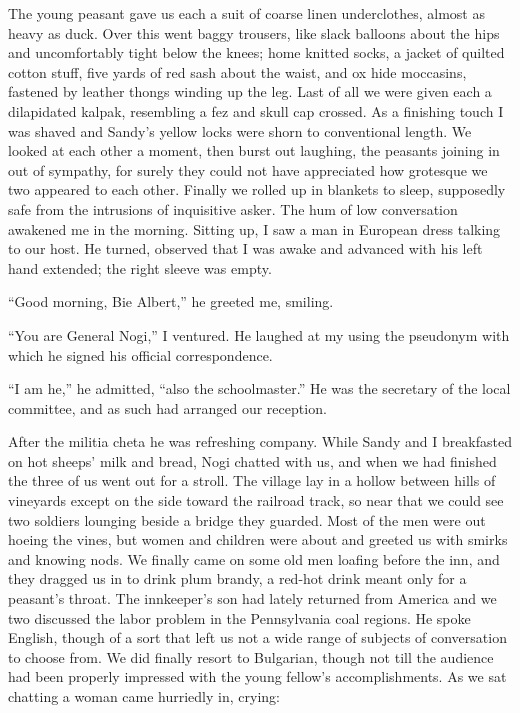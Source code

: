 \documentclass[a5paper,12pt]{book}
\begin{document}
The young peasant gave us each a suit of coarse linen underclothes, almost as heavy as duck. Over this went baggy trousers, like slack balloons about the hips and uncomfortably tight below the knees; home knitted socks, a jacket of quilted cotton stuff, five yards of red sash about the waist, and ox hide moccasins, fastened by leather thongs winding up the leg. Last of all we were given each a dilapidated kalpak, resembling a fez and skull cap crossed. As a finishing touch I was shaved and Sandy’s yellow locks were shorn to conventional length. We looked at each other a moment, then burst out laughing, the peasants joining in out of sympathy, for surely they could not have appreciated how grotesque we two appeared to each other. Finally we rolled up in blankets to sleep, supposedly safe from the intrusions of inquisitive asker.
The hum of low conversation awakened me in the morning. Sitting up, I saw a man in European dress talking to our host. He turned, observed that I was awake and advanced with his left hand extended; the right sleeve was empty.

“Good morning, Bie Albert,” he greeted me, smiling.

“You are General Nogi,” I ventured. He laughed at my using the pseudonym with which he signed his official correspondence.

“I am he,” he admitted, “also the schoolmaster.” He was the secretary of the local committee, and as such had arranged our reception.

After the militia cheta he was refreshing company. While Sandy and I breakfasted on hot sheeps’ milk and bread, Nogi chatted with us, and when we had finished the three of us went out for a stroll. The village lay in a hollow between hills of vineyards except on the side toward the railroad track, so near that we could see two soldiers lounging beside a bridge they guarded. Most of the men were out hoeing the vines, but women and children were about and greeted us with smirks and knowing nods. We finally came on some old men loafing before the inn, and they dragged us in to drink plum brandy, a red-hot drink meant only for a peasant’s throat. The innkeeper’s son had lately returned from America and we two discussed the labor problem in the Pennsylvania coal regions. He spoke English, though of a sort that left us not a wide range of subjects of conversation to choose from. We did finally resort to Bulgarian, though not till the audience had been properly impressed with the young fellow’s accomplishments. As we sat chatting a woman came hurriedly in, crying:
\end{document}
